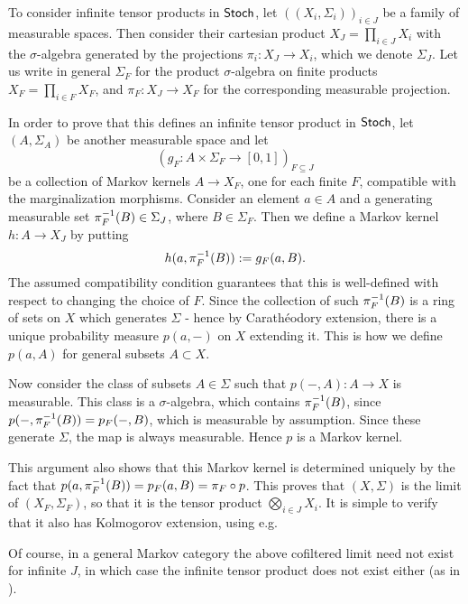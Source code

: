 \documentclass[11pt]{article}
\begin{document}
\begin{example}
	To consider infinite tensor products in $\operatorname{\mathsf{Stoch}}$, let $\left((X_i,\Sigma_i)\right)_{i\in J}$ be a family of measurable spaces. Then consider their cartesian product $X_J = \prod_{i \in J} X_i$ with the $\sigma$-algebra generated by the projections $\pi_i: X_J \to X_i$, which we denote $\Sigma_J$. Let us write in general $\Sigma_F$ for the product $\sigma$-algebra on finite products $X_F = \prod_{i\in F}X_F$, and $\pi_F: X_J \to X_F$ for the corresponding measurable projection.

	In order to prove that this defines an infinite tensor product in $\operatorname{\mathsf{Stoch}}$, let $(A,\Sigma_A)$ be another measurable space and let
	\[
		\left(g_F: A \times \Sigma_F \to [0,1]\right)_{F \subseteq J}
	\]
	be a collection of Markov kernels $A \to X_F$, one for each finite $F$, compatible with the marginalization morphisms. Consider an element $a \in A$ and a generating measurable set $\pi_F^{-1}(B) \in \Sigma_J$, where $B \in \Sigma_F$. Then we define a Markov kernel $h : A \to X_J$ by putting
	\[
		h(a,\pi_F^{-1}(B)) := g_F(a,B).
	\]
	The assumed compatibility condition guarantees that this is well-defined with respect to changing the choice of $F$. Since the collection of such $\pi_F^{-1}(B)$ is a ring of sets on $X$ which generates $\Sigma$ - hence by Carath\'eodory extension, there is a unique probability measure
$p(a,-)$ on $X$ extending it. This is how we define $p(a,A)$ for general subsets $A \subset X$.

Now consider the class of subsets $A \in \Sigma$ such that $p(-,A):A \to X$ is measurable.
This class is a $\sigma$-algebra, which contains $\pi_F^{-1}(B)$, since $p(-,\pi_F^{-1}(B)) = p_F(-,B)$, which is measurable by assumption.
Since these generate $\Sigma$, the map is always measurable.
Hence $p$ is a Markov kernel.

This argument also shows that this Markov kernel is determined uniquely by the fact that $p(a,\pi_F^{-1}(B)) = p_F(a,B) = \pi_F \circ p$.
This proves that $(X,\Sigma)$ is the limit of $(X_F,\Sigma_F)$, so that it is the tensor product $\bigotimes_{i\in J} X_i$.
It is simple to verify that it also has Kolmogorov extension, using e.g. \cite[Example~10.4]{markov_cats}
\end{example}

Of course, in a general Markov category the above cofiltered limit need not exist for infinite $J$, in which case the infinite tensor product does not exist either (as in ).
\end{document}
